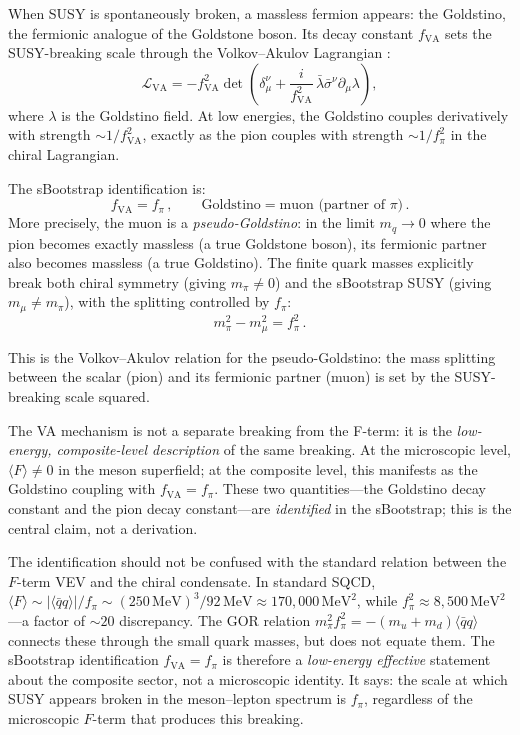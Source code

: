 \documentclass[12pt,a4paper]{article}
\newcommand{\MeV}{\,\text{MeV}}
\newcommand{\qqbar}{\langle\bar{q}q\rangle}
\begin{document}
When SUSY is spontaneously broken, a massless fermion appears: the 
Goldstino, the fermionic analogue of the Goldstone boson. Its decay 
constant $f_{\text{VA}}$ sets the SUSY-breaking scale through the 
Volkov--Akulov Lagrangian \cite{VolkovAkulov1973}:
\begin{equation}
\mathcal{L}_{\text{VA}} = -f_{\text{VA}}^2 \det\!\left(
\delta_\mu^\nu + \frac{i}{f_{\text{VA}}^2}\,\bar{\lambda}\bar{\sigma}^\nu
\partial_\mu\lambda\right),
\end{equation}
where $\lambda$ is the Goldstino field. At low energies, the Goldstino 
couples derivatively with strength $\sim 1/f_{\text{VA}}^2$, exactly 
as the pion couples with strength $\sim 1/f_\pi^2$ in the chiral 
Lagrangian.

The sBootstrap identification is:
\begin{equation}
\label{eq:va_id}
f_{\text{VA}} = f_\pi\,, \qquad 
\text{Goldstino} = \text{muon (partner of }\pi\text{)}\,.
\end{equation}
More precisely, the muon is a \emph{pseudo-Goldstino}: in the 
limit $m_q \to 0$ where the pion becomes exactly massless (a true 
Goldstone boson), its fermionic partner also becomes massless (a 
true Goldstino). The finite quark masses explicitly break both 
chiral symmetry (giving $m_\pi \neq 0$) and the sBootstrap SUSY 
(giving $m_\mu \neq m_\pi$), with the splitting controlled by 
$f_\pi$:
\begin{equation}
m_\pi^2 - m_\mu^2 = f_\pi^2\,.
\end{equation}

This is the Volkov--Akulov relation for the pseudo-Goldstino: the 
mass splitting between the scalar (pion) and its fermionic partner 
(muon) is set by the SUSY-breaking scale squared.

The VA mechanism is not a separate breaking from the F-term: it is 
the \emph{low-energy, composite-level description} of the same 
breaking. At the microscopic level, $\langle F\rangle \neq 0$ 
in the meson superfield; at the composite level, this manifests 
as the Goldstino coupling with $f_{\text{VA}} = f_\pi$. These 
two quantities---the Goldstino decay constant and the pion decay 
constant---are \emph{identified} in the sBootstrap; this is the 
central claim, not a derivation.

The identification should not be confused with the standard relation 
between the $F$-term VEV and the chiral condensate. In standard 
SQCD, $\langle F\rangle \sim |\qqbar|/f_\pi \sim (250\MeV)^3/92\MeV 
\approx 170{,}000\MeV^2$, while $f_\pi^2 \approx 8{,}500\MeV^2$---a 
factor of $\sim 20$ discrepancy. The GOR relation 
$m_\pi^2 f_\pi^2 = -(m_u + m_d)\qqbar$ connects these through the 
small quark masses, but does not equate them. The sBootstrap 
identification $f_{\text{VA}} = f_\pi$ is therefore a 
\emph{low-energy effective} statement about the composite sector, 
not a microscopic identity. It says: the scale at which SUSY 
appears broken in the meson--lepton spectrum is $f_\pi$, regardless 
of the microscopic $F$-term that produces this breaking.
\end{document}
